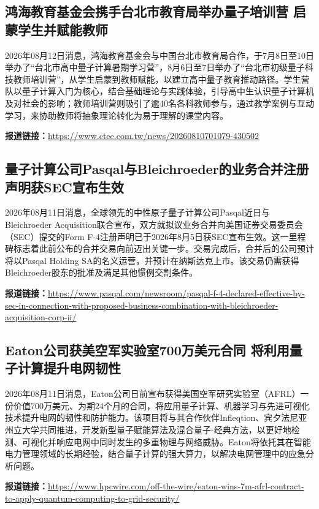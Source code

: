 \documentclass[12pt,a4paper]{ctexart}
\begin{document}
\subsection{ 鸿海教育基金会携手台北市教育局举办量子培训营 启蒙学生并赋能教师 }

2026年08月12日消息，鸿海教育基金会与中国台北市教育局合作，于7月8日至10日举办了“台北市高中量子计算暑期学习营”，8月6日至7日举办了“台北市初级量子科技教师培训营”，从学生启蒙到教师赋能，以建立高中量子教育推动路径。学生营队以量子计算入门为核心，结合基础理论与实践体验，引导高中生认识量子计算机及对社会的影响；教师培训营则吸引了逾40名各科教师参与，通过教学案例与互动学习，来协助教师将抽象理论转化为易于理解的课堂内容。

\noindent\textbf{报道链接：}\url{https://www.ctee.com.tw/news/20260810701079-430502}

\subsection{ 量子计算公司Pasqal与Bleichroeder的业务合并注册声明获SEC宣布生效 }

2026年08月11日消息，全球领先的中性原子量子计算公司Pasqal近日与Bleichroeder Acquisition联合宣布，双方就拟议业务合并向美国证券交易委员会（SEC）提交的Form F-4注册声明已于2026年8月5日获SEC宣布生效。这一里程碑标志着此前公布的合并交易向前迈出关键一步。交易完成后，合并后的公司预计将以Pasqal Holding SA的名义运营，并预计在纳斯达克上市。该交易仍需获得Bleichroeder股东的批准及满足其他惯例交割条件。

\noindent\textbf{报道链接：}\url{https://www.pasqal.com/newsroom/pasqal-f-4-declared-effective-by-sec-in-connection-with-proposed-business-combination-with-bleichroeder-acquisition-corp-ii/}

\subsection{ Eaton公司获美空军实验室700万美元合同 将利用量子计算提升电网韧性 }

2026年08月11日消息，Eaton公司日前宣布获得美国空军研究实验室（AFRL）一份价值700万美元、为期24个月的合同，将应用量子计算、机器学习与先进可视化技术提升电网的韧性和防护能力。该项目将与其合作伙伴Infleqtion、宾夕法尼亚州立大学共同推进，开发新型量子赋能算法及混合量子-经典方法，以更好地检测、可视化并响应电网中同时发生的多重物理与网络威胁。Eaton将依托其在智能电力管理领域的长期经验，结合量子计算的强大算力，以解决电网管理中的应急分析问题。

\noindent\textbf{报道链接：}\url{https://www.hpcwire.com/off-the-wire/eaton-wins-7m-afrl-contract-to-apply-quantum-computing-to-grid-security/}
\end{document}
